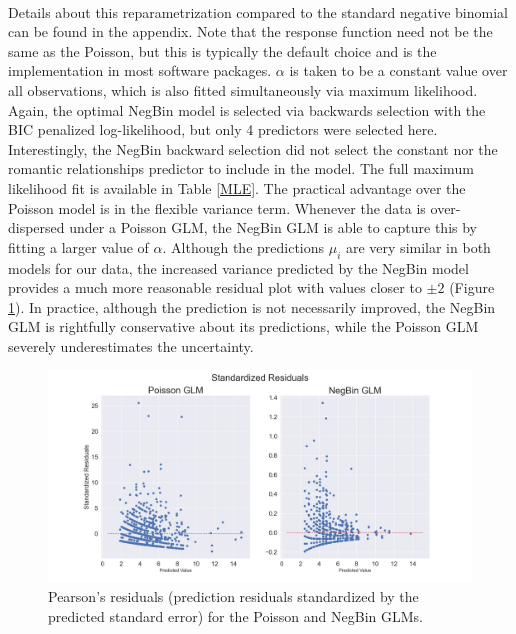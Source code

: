 \documentclass[12pt, titlepage]{article}
\begin{document}
	\paragraph{} Details about this reparametrization compared to the standard negative binomial can be found in the appendix. Note that the response function need not be the same as the Poisson, but this is typically the default choice and is the implementation in most software packages. $\alpha$ is taken to be a constant value over all observations, which is also fitted simultaneously via maximum likelihood. Again, the optimal NegBin model is selected via backwards selection with the BIC penalized log-likelihood, but only 4 predictors were selected here. Interestingly, the NegBin backward selection did not select the constant nor the romantic relationships predictor to include in the model. The full maximum likelihood fit is available in Table \ref{MLE}. The practical advantage over the Poisson model is in the flexible variance term. Whenever the data is over-dispersed under a Poisson GLM, the NegBin GLM is able to capture this by fitting a larger value of $\alpha$. Although the predictions $\mu_i$ are very similar in both models for our data, the increased variance predicted by the NegBin model provides a much more reasonable residual plot with values closer to $\pm 2$ (Figure \ref{resid}). In practice, although the prediction is not necessarily improved, the NegBin GLM is rightfully conservative about its predictions, while the Poisson GLM severely underestimates the uncertainty. 
	
	\begin{figure}[h!]
	\centering
	\includegraphics[width = \textwidth]{fig/resid.png}
	\caption{Pearson's residuals (prediction residuals standardized by the predicted standard error) for the Poisson and NegBin GLMs.}
	\label{resid}
	\end{figure}
\end{document}
